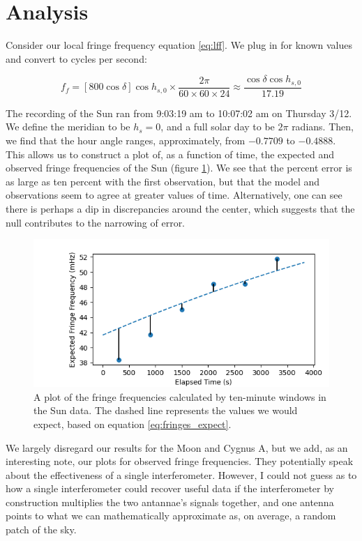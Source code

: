 \documentclass[12pt]{article}
\begin{document}
\section{Analysis}

\quad \quad Consider our local fringe frequency equation \ref{eq:lff}. We plug in for known values and convert to cycles per second:

\begin{equation} \label{eq:fringes_expect}
f_f = \left[ 800 \cos \delta \right] \cos h_{s, 0} \times \frac{2 \pi}{60 \times 60 \times 24} \approx \frac{\cos \delta \cos h_{s, 0}}{17.19}
\end{equation} 

The recording of the Sun ran from 9:03:19 am to 10:07:02 am on Thursday 3/12. We define the meridian to be $h_s = 0$, and a full solar day to be $2\pi$ radians. Then, we find that the hour angle ranges, approximately, from $-0.7709$ to $-0.4888$. This allows us to construct a plot of, as a function of time, the expected and observed fringe frequencies of the Sun (figure \ref{fig:Sun_fringes}). We see that the percent error is as large as ten percent with the first observation, but that the model and observations seem to agree at greater values of time. Alternatively, one can see there is perhaps a dip in discrepancies around the center, which suggests that the null contributes to the narrowing of error.

\begin{figure}
	\centering
	\includegraphics[width=.6\linewidth]{yeah_thatsright}
	\caption{A plot of the fringe frequencies calculated by ten-minute windows in the Sun data. The dashed line represents the values we would expect, based on equation \ref{eq:fringes_expect}.}
	\label{fig:Sun_fringes}
\end{figure}

We largely disregard our results for the Moon and Cygnus A, but we add, as an interesting note, our plots for observed fringe frequencies. They potentially speak about the effectiveness of a single interferometer. However, I could not guess as to how a single interferometer could recover useful data if the interferometer by construction multiplies the two antannae's signals together, and one antenna points to what we can mathematically approximate as, on average, a random patch of the sky. 
\end{document}
